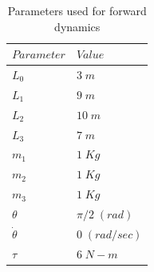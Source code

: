 \documentclass[10pt,aspectratio=169]{beamer}
\begin{document}
\begin{frame}
\begin{columns}
	\begin{column}{4cm}
	\begin{table}
		\caption{Parameters used for forward dynamics}
		{\scriptsize 
			\begin{tabular}{ll}
				\hline
				$Parameter$ & $Value$ \\
				\hline
				$L_0$ & $3\; m$\\
				$L_1$ & $9\; m$ \\	
				$L_2$ & $10\; m$\\
				$L_3$ & $7\; m$\\
				$m_1$ & $1\; Kg$ \\	
				$m_2$ & $1\; Kg$\\
				$m_3$ & $1\; Kg$\\
				$\theta$ & $\pi/2\; (rad)$\\
				$\dot{\theta}$ & $0\; (rad/sec)$\\
				$\tau$ & $6\; N-m$\\
				\hline
			\end{tabular}
		}
	\end{table}
	\end{column}
\end{columns}
\end{frame}
\usebackgroundtemplate{ }
\end{document}
